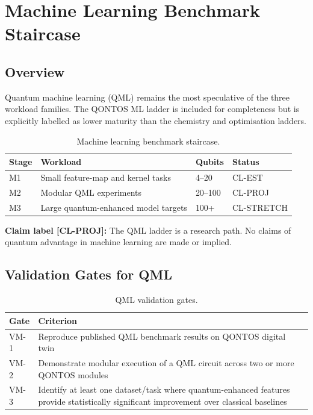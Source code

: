 \documentclass[conference]{IEEEtran}
\begin{document}
\section{Machine Learning Benchmark Staircase}

\subsection{Overview}

Quantum machine learning (QML) remains the most speculative of the three workload
families. The QONTOS ML ladder is included for completeness but is explicitly labelled
as lower maturity than the chemistry and optimisation ladders.

\begin{table}[H]
\centering
\caption{Machine learning benchmark staircase.}
\begin{tabular}{@{}l l l l@{}}
\toprule
\textbf{Stage} & \textbf{Workload} & \textbf{Qubits} & \textbf{Status} \\
\midrule
M1 & Small feature-map and kernel tasks & 4--20 & CL-EST \\
M2 & Modular QML experiments & 20--100 & CL-PROJ \\
M3 & Large quantum-enhanced model targets & 100+ & CL-STRETCH \\
\bottomrule
\end{tabular}
\end{table}

\textbf{Claim label [CL-PROJ]:} The QML ladder is a research path. No claims of quantum
advantage in machine learning are made or implied.

\subsection{Validation Gates for QML}

\begin{table}[H]
\centering
\caption{QML validation gates.}
\begin{tabular}{@{}l L{6cm}@{}}
\toprule
\textbf{Gate} & \textbf{Criterion} \\
\midrule
VM-1 & Reproduce published QML benchmark results on QONTOS digital twin \\
VM-2 & Demonstrate modular execution of a QML circuit across two or more QONTOS modules \\
VM-3 & Identify at least one dataset/task where quantum-enhanced features provide statistically significant improvement over classical baselines \\
\bottomrule
\end{tabular}
\end{table}
\end{document}
